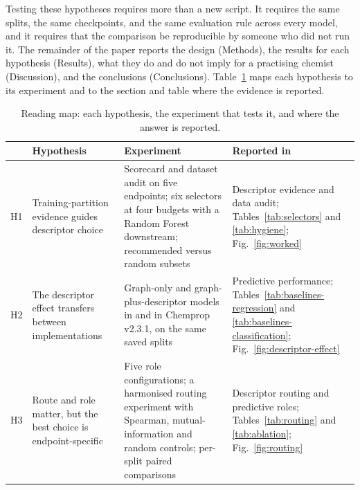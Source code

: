 Testing these hypotheses requires more than a new script. It requires the same splits, the same checkpoints, and the same evaluation rule across every model, and it requires that the comparison be reproducible by someone who did not run it. The remainder of the paper reports the design (Methods), the results for each hypothesis (Results), what they do and do not imply for a practising chemist (Discussion), and the conclusions (Conclusions). Table~\ref{tab:result-map} maps each hypothesis to its experiment and to the section and table where the evidence is reported.

\begin{table}[t]
\caption{Reading map: each hypothesis, the experiment that tests it, and where the answer is reported.}
\label{tab:result-map}
\centering
\footnotesize
\setlength{\tabcolsep}{4pt}
\begin{tabular}{@{}>{\raggedright\arraybackslash}p{}>{\raggedright\arraybackslash}p{}>{\raggedright\arraybackslash}p{}>{\raggedright\arraybackslash}p{}@{}}
\toprule
 & Hypothesis & Experiment & Reported in \\
\midrule
H1 & Training-partition evidence guides descriptor choice & Scorecard and dataset audit on five endpoints; six selectors at four budgets with a Random Forest downstream; recommended versus random subsets & Descriptor evidence and data audit; Tables~\ref{tab:selectors} and \ref{tab:hygiene}; Fig.~\ref{fig:worked} \\
H2 & The descriptor effect transfers between implementations & Graph-only and graph-plus-descriptor models in \framework{} and in Chemprop v2.3.1, on the same saved splits & Predictive performance; Tables~\ref{tab:baselines-regression} and \ref{tab:baselines-classification}; Fig.~\ref{fig:descriptor-effect} \\
H3 & Route and role matter, but the best choice is endpoint-specific & Five role configurations; a harmonised routing experiment with Spearman, mutual-information and random controls; per-split paired comparisons & Descriptor routing and predictive roles; Tables~\ref{tab:routing} and \ref{tab:ablation}; Fig.~\ref{fig:routing} \\
\bottomrule
\end{tabular}
\end{table}
